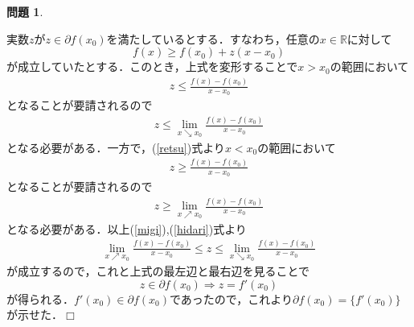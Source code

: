 \documentclass[titlepage]{jsarticle}
\theoremstyle{definition}
\newtheorem{Ex}{問題}
\theoremstyle{mystyle} %
\def\qed{\hfill$\Box$}
\begin{document}
\begin{Ex}
\begin{enumerate}[(a)]
実数$z$が$z\in \partial f(x_0)$を満たしているとする．すなわち，任意の$x\in\mathbb{R}$に対して
\begin{equation}
\label{retsu}
f(x)\geq f(x_0)+z(x-x_0)
\end{equation}
が成立していたとする．このとき，上式を変形することで$x>x_0$の範囲において
\begin{align*}
z\leq \frac{f(x)-f(x_0)}{x-x_0}
\end{align*}
となることが要請されるので
\begin{align}
\label{migi}
z\leq \lim_{x\searrow x_0}\frac{f(x)-f(x_0)}{x-x_0}
\end{align}
となる必要がある．一方で，(\ref{retsu})式より$x<x_0$の範囲において
\begin{align*}
z\geq \frac{f(x)-f(x_0)}{x-x_0}
\end{align*}
となることが要請されるので
\begin{align}
\label{hidari}
z\geq \lim_{x\nearrow x_0}\frac{f(x)-f(x_0)}{x-x_0}
\end{align}
となる必要がある．以上(\ref{migi}),(\ref{hidari})式より
\begin{align*}
\lim_{x\nearrow x_0}\frac{f(x)-f(x_0)}{x-x_0}\leq z\leq \lim_{x\searrow x_0}\frac{f(x)-f(x_0)}{x-x_0}
\end{align*}
が成立するので，これと上式の最左辺と最右辺を見ることで
$$z\in \partial f(x_0)\Rightarrow z = f'(x_0)$$
が得られる．$f'(x_0)\in\partial f(x_0)$であったので，これより$\partial f(x_0)=\{f'(x_0)\}$が示せた．\qed\\
\end{enumerate}
\end{Ex}
\end{document}
